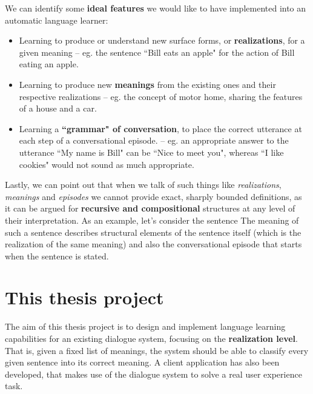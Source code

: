 We can identify some \textbf{ideal features} we would like to have implemented into an automatic language learner:
\begin{itemize}
	\item Learning to produce or understand new surface forms, or \textbf{realizations}, for a given meaning -- eg. the sentence ``Bill eats an apple" for the action of Bill eating an apple.
	\item Learning to produce new \textbf{meanings} from the existing ones and their respective realizations -- eg. the concept of motor home, sharing the features of a house and a car.
	\item Learning a \textbf{``grammar" of conversation}, to place the correct utterance at each step of a conversational episode. -- eg. an appropriate answer to the utterance ``My name is Bill" can be ``Nice to meet you", whereas ``I like cookies" would not sound as much appropriate.
\end{itemize}
Lastly, we can point out that when we talk of such things like \emph{realizations}, \emph{meanings} and \emph{episodes} we cannot provide exact, sharply bounded definitions, as it can be argued for \textbf{recursive and compositional} structures at any level of their interpretation. As an example, let's consider the sentence  The meaning of such a sentence describes structural elements of the sentence itself (which is the realization of the same meaning) and also the conversational episode that starts when the sentence is stated.


\section{This thesis project} \label{ch:intro:project}

The aim of this thesis project is to design and implement language learning capabilities for an existing dialogue system, focusing on the \textbf{realization level}. That is, given a fixed list of meanings, the system should be able to classify every given sentence into its correct meaning. A client application has also been developed, that makes use of the dialogue system to solve a real user experience task.

